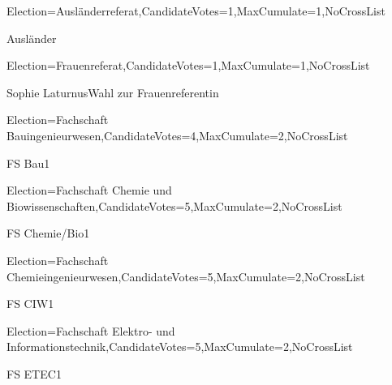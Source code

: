 \documentclass{ballot}
\begin{document}
\begin{election}{Election={Ausländerreferat},CandidateVotes=1,MaxCumulate=1,NoCrossList}
\begin{party}{Ausländer}{}{}
\end{party}
\end{election}
\begin{election}{Election={Frauenreferat},CandidateVotes=1,MaxCumulate=1,NoCrossList}
\begin{party}{Sophie Laturnus}{Wahl zur Frauenreferentin}{}
\end{party}
\end{election}
\begin{election}{Election={Fachschaft Bauingenieurwesen},CandidateVotes=4,MaxCumulate=2,NoCrossList}
\begin{party}{FS Bau}{}{1}
\end{party}
\end{election}
\begin{election}{Election={Fachschaft Chemie und Biowissenschaften},CandidateVotes=5,MaxCumulate=2,NoCrossList}
\begin{party}{FS Chemie/Bio}{}{1}
\end{party}
\end{election}
\begin{election}{Election={Fachschaft Chemieingenieurwesen},CandidateVotes=5,MaxCumulate=2,NoCrossList}
\begin{party}{FS CIW}{}{1}
\end{party}
\end{election}
\begin{election}{Election={Fachschaft Elektro- und Informationstechnik},CandidateVotes=5,MaxCumulate=2,NoCrossList}
\begin{party}{FS ETEC}{}{1}
\end{party}
\end{election}
\end{document}
